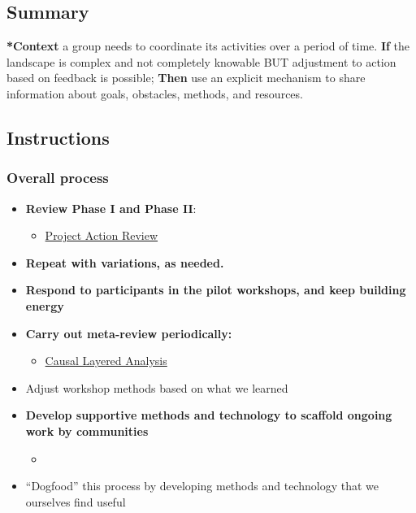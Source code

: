 \documentclass{article}
\begin{document}
\subsection{Summary}

\textbf{*Context} a group needs to coordinate its activities over a period of
time. \textbf{If} the landscape is complex and not completely knowable BUT
adjustment to action based on feedback is possible; \textbf{Then} use an
explicit mechanism to share information about goals, obstacles, methods,
and resources.

\subsection{Instructions}

\subsubsection{Overall process}

\begin{itemize}
\item \textbf{Review Phase I and Phase II}:
\begin{itemize}
\item \hyperref[f5a1bc15-5abb-44d6-8f7a-e254974c9002]{Project Action Review}
\end{itemize}
\item \textbf{Repeat with variations, as needed.}
\item \textbf{Respond to participants in the pilot workshops, and keep building energy}
\item \textbf{Carry out meta-review periodically:}
\begin{itemize}
\item \hyperref[56ce8d31-d3d6-4493-bb41-b07d810afbcc]{Causal Layered Analysis}
\end{itemize}
\item Adjust workshop methods based on what we learned
\item \textbf{Develop supportive methods and technology to scaffold ongoing work by communities}
\begin{itemize}
\item{}
\end{itemize}
\item ``Dogfood'' this process by developing methods and technology that we ourselves find useful
\end{itemize}
\end{document}

